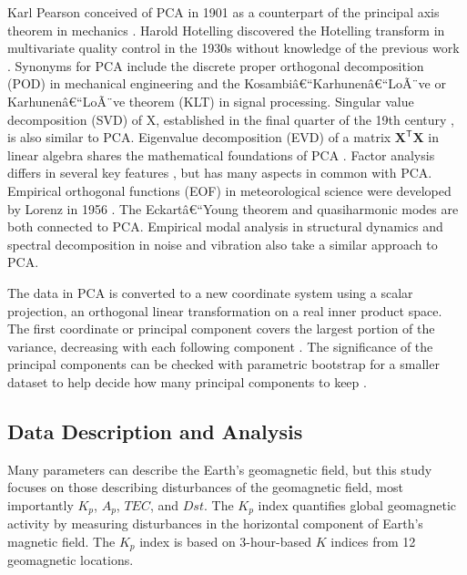 \documentclass[sn-mathphys-num]{sn-jnl}%
\begin{document}
Karl Pearson \cite{pearson1901liii} conceived of PCA in 1901 as a counterpart of the principal axis theorem in mechanics \cite{stewart2019introduction}. Harold Hotelling discovered the Hotelling transform in multivariate quality control in the 1930s without knowledge of the previous work \cite{hotelling1933analysis, hotelling1992relations}. Synonyms for PCA include the discrete proper orthogonal decomposition (POD) \cite{berkooz1993proper, karhunen1946spektraltheorie, loeve1977elementary, sirovich1987turbulence} in mechanical engineering and the Kosambiâ€“Karhunenâ€“LoÃ¨ve or Karhunenâ€“LoÃ¨ve theorem (KLT) \cite{sapatnekar2011overcoming, ghoman2012pod, archiveKarhunenLoeveTransform, amslaurea10169, mallat1999wavelet, tang1998texture} in signal processing. Singular value decomposition (SVD) of X, established in the final quarter of the 19th century \cite{stewart1993early}, is also similar to PCA. Eigenvalue decomposition (EVD) of a matrix $\mathbf{X}^{\mathsf{T}}\mathbf{X}$ in linear algebra shares the mathematical foundations of PCA \cite{gloub1996matrix, hayden2002observations}. Factor analysis differs in several key features \cite{jolliffe2002principal}, but has many aspects in common with PCA. Empirical orthogonal functions (EOF) \cite{lorenz1956empirical} in meteorological science were developed by Lorenz in 1956 \cite{lorenz1956empirical}. The Eckartâ€“Young theorem \cite{eckart1936approximation} and quasiharmonic modes \cite{dove1993introduction} are both connected to PCA. Empirical modal analysis in structural dynamics and spectral decomposition in noise and vibration also take a similar approach to PCA.

The data in PCA is converted to a new coordinate system using a scalar projection, an orthogonal linear transformation on a real inner product space. The first coordinate or principal component covers the largest portion of the variance, decreasing with each following component \cite{jolliffe2002principal, bengio2013representation}. The significance of the principal components can be checked with parametric bootstrap for a smaller dataset to help decide how many principal components to keep \cite{forkman2019hypothesis}.

\subsection{Data Description and Analysis}

Many parameters can describe the Earth's geomagnetic field, but this study focuses on those describing disturbances of the geomagnetic field, most importantly $K_p$, $A_p$, $TEC$, and $Dst$. The $K_p$ index quantifies global geomagnetic activity by measuring disturbances in the horizontal component of Earth's magnetic field. The $K_p$ index is based on 3-hour-based $K$ indices from 12 geomagnetic locations.
\end{document}
